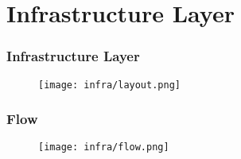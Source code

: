 \section{Infrastructure Layer}


\begin{frame}
  \frametitle{Infrastructure Layer}
  \begin{figure}
    \centering
    \texttt{[image: infra/layout.png]} %
    \caption{}
  \end{figure}
\end{frame}


\begin{frame}
    \frametitle{ Flow}
    \begin{figure}
        \centering
        \texttt{[image: infra/flow.png]} %
        \caption{}
    \end{figure}
\end{frame}





